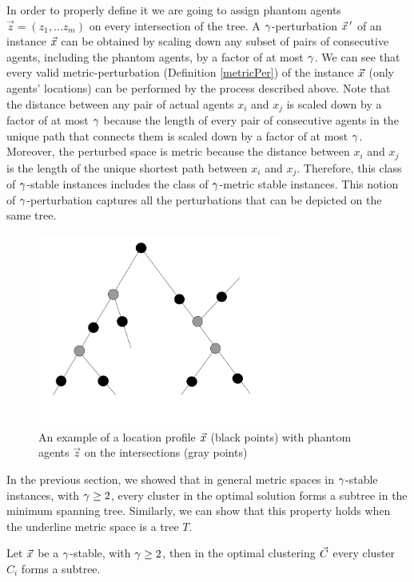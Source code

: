In order to properly define it we are going to assign phantom agents $\vec{z}=(z_1,...z_m)$ on every intersection of the tree. A $\gamma$-perturbation $\vec{x}\,'$ of an instance $\vec{x}$ can be obtained by scaling down any subset of pairs of consecutive agents, including the phantom agents, by a factor of at most $\gamma$. We can see that every valid metric-perturbation (Definition \ref{metricPer}) of the instance $\vec{x}$ (only agents' locations) can be performed by the process described above. Note that the distance between any pair of actual agents $x_i$ and $x_j$ is scaled down by a factor of at most $\gamma$ because the length of every pair of consecutive agents in the unique path that connects them is scaled down by a factor of at most $\gamma$. Moreover, the perturbed space is metric because the distance between $x_i$ and $x_j$ is the length of the unique shortest path between $x_i$ and $x_j$. Therefore, this class of $\gamma$-stable instances includes the class of $\gamma$-metric stable instances.  This notion of $\gamma$-perturbation captures all the perturbations that can be depicted on the same tree.



\begin{figure}[ht]
    \centering
    \includegraphics[width=8cm]{Images/Perturbation1.png}
    \caption{An example of a location profile $\vec{x}$ (black points) with phantom agents $\vec{z}$ on the intersections (gray points)}
    \label{fig:per}
\end{figure}



In the previous section, we showed that in general metric spaces in $\gamma$-stable instances, with $\gamma\ge2$, every cluster in the optimal solution forms a subtree in the minimum spanning tree. Similarly, we can show that this property holds when the underline metric space is a tree $T$. 
\begin{obs}\label{obs:subtrees}
Let $\vec{x}$ be a $\gamma$-stable, with $\gamma\ge2$, then in the optimal clustering $\vec{C}$ every cluster $C_i$ forms a subtree.
\end{obs}

